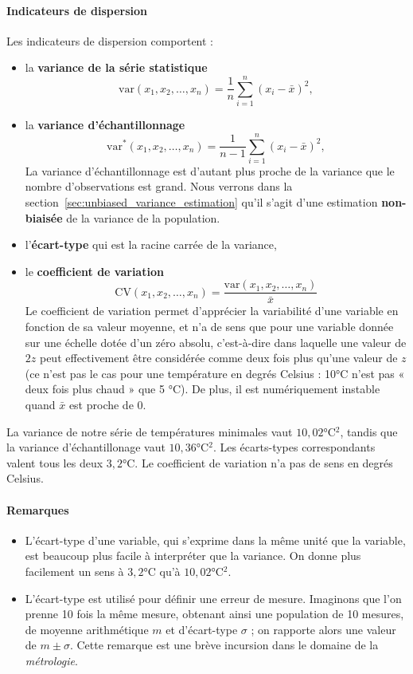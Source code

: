 \paragraph{Indicateurs de dispersion} Les indicateurs de dispersion comportent : 
\begin{itemize}
\item la \textbf{variance de la série statistique} 
\[ \text{var}(x_1, x_2, \dots, x_n) = \frac1n \sum_{i=1}^n (x_i - \bar x)^2,\]
\item la \textbf{variance d'échantillonnage} 
  \[ \text{var}^*(x_1, x_2, \dots, x_n) = \frac1{n-1} \sum_{i=1}^n (x_i - \bar
    x)^2,\]
  La variance d'échantillonnage est d'autant plus proche de la variance que le
  nombre d'observations est grand. Nous verrons dans la
  section~\ref{sec:unbiased_variance_estimation} qu'il s'agit d'une estimation
  \textbf{non-biaisée} de la variance de la population.
\item l'\textbf{écart-type} qui est la racine carrée de la variance, 
\item le \textbf{coefficient de variation} 
  \[ \text{CV}(x_1, x_2, \dots, x_n) = \frac{\text{var}(x_1, x_2, \dots, x_n)}{\bar
      x}\]
  Le coefficient de variation permet d'apprécier la variabilité d'une variable
  en fonction de sa valeur moyenne, et n'a de sens que pour une variable donnée
  sur une échelle dotée d'un zéro absolu, c'est-à-dire dans laquelle une valeur
  de $2z$ peut effectivement être considérée comme deux fois plus qu'une valeur
  de $z$ (ce n'est pas le cas pour une température en degrés Celsius :
  10\si{\celsius} n'est pas « deux fois plus chaud » que 5 \si{\celsius}). De
  plus, il est numériquement instable quand $\bar x$ est proche de 0.
\end{itemize}
\pagebreak
\begin{exemple}
  La variance de notre série de températures minimales vaut $10,02 \si{\celsius^2}$,
  tandis que la variance d'échantillonage vaut $10,36 \si{\celsius^2}$. Les
  écarts-types correspondants valent tous les deux $3,2 \si{\celsius}$.  Le
  coefficient de variation n'a pas de sens en degrés Celsius.
\end{exemple}
\paragraph{Remarques}
\begin{itemize}
\item L'écart-type d'une variable, qui s'exprime dans la même unité que la
  variable, est beaucoup plus facile à interpréter que la variance. On donne
  plus facilement un sens à $3,2 \si{\celsius}$ qu'à $10,02 \si{\celsius^2}$.
\item L'écart-type est utilisé pour définir une erreur de mesure. Imaginons que
  l'on prenne 10 fois la même mesure, obtenant ainsi une population de 10
  mesures, de moyenne arithmétique $m$ et d'écart-type $\sigma$ ; on rapporte
  alors une valeur de $m \pm \sigma$. Cette remarque est une brève incursion
  dans le domaine de la \textit{métrologie}.
\end{itemize}

